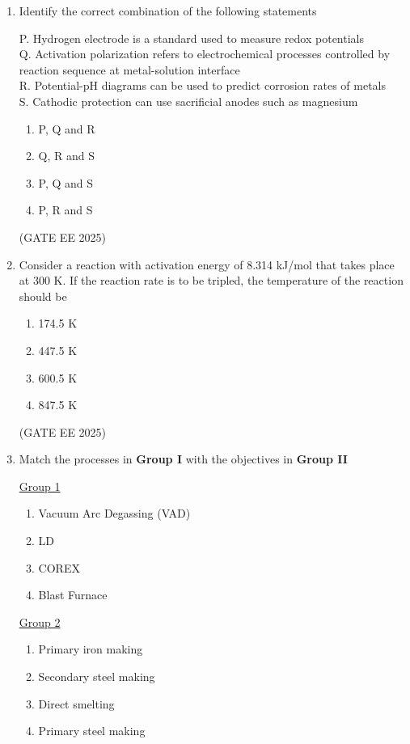 \documentclass[11pt, letterpaper]{article}
\theoremstyle{remark}
\begin{document}
\begin{enumerate}
\item Identify the correct combination of the following statements

P. Hydrogen electrode is a standard used to measure redox potentials \\
Q. Activation polarization refers to electrochemical processes controlled by reaction sequence at metal-solution interface \\
R. Potential-pH diagrams can be used to predict corrosion rates of metals \\
S. Cathodic protection can use sacrificial anodes such as magnesium

\begin{multicols}{2}
\begin{enumerate}  
\item P, Q and R
\item Q, R and S
\item P, Q and S
\item P, R and S
\end{enumerate}
\end{multicols}
\hfill(GATE EE 2025)

\item Consider a reaction with activation energy of 8.314 kJ/mol that takes place at 300 K. If the reaction rate is to be tripled, the temperature of the reaction should be

\begin{multicols}{2}
\begin{enumerate}  
\item 174.5 K
\item 447.5 K
\item 600.5 K
\item 847.5 K
\end{enumerate}
\end{multicols}
\hfill(GATE EE 2025)

\item Match the processes in \textbf{Group I} with the objectives in \textbf{Group II}
\begin{multicols}{2}
\underline{Group 1}
\begin{enumerate}[label=(\Alph*), start=16]
\item Vacuum Arc Degassing (VAD)  
\item LD
\item COREX 
\item Blast Furnace
\end{enumerate}

\underline{Group 2}
\begin{enumerate}[label=(\arabic*), start=1]
\item Primary iron making 
\item Secondary steel making 
\item Direct smelting
\item Primary steel making 
\end{enumerate}
\end{multicols}


\end{enumerate}
\end{document}

